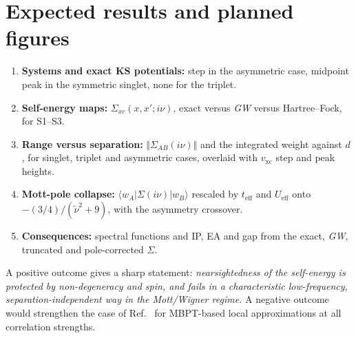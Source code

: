 \documentclass[11pt,a4paper]{article}
\newcommand{\GW}{\textit{GW}}
\newcommand{\vxc}{v_\mathrm{xc}}
\newcommand{\teff}{t_\mathrm{eff}}
\newcommand{\Ueff}{U_\mathrm{eff}}
\begin{document}
\section{Expected results and planned figures}
\begin{enumerate}
\item \textbf{Systems and exact KS potentials:} step in the asymmetric case, midpoint peak in the symmetric singlet, none for the triplet.
\item \textbf{Self-energy maps:} $\Sigma_{xc}(x,x';i\nu)$, exact versus \GW{} versus Hartree--Fock, for S1--S3.
\item \textbf{Range versus separation:} $\Vert\Sigma_{AB}(i\nu)\Vert$ and the integrated weight against $d$, for singlet, triplet and asymmetric cases, overlaid with $\vxc$ step and peak heights.
\item \textbf{Mott-pole collapse:} $\langle w_A|\Sigma(i\nu)|w_B\rangle$ rescaled by $\teff$ and $\Ueff$ onto $-(3/4)/(\tilde\nu^2+9)$, with the asymmetry crossover.
\item \textbf{Consequences:} spectral functions and IP, EA and gap from the exact, \GW{}, truncated and pole-corrected $\Sigma$.
\end{enumerate}

A positive outcome gives a sharp statement: \emph{nearsightedness of the self-energy is protected by non-degeneracy and spin, and fails in a characteristic low-frequency, separation-independent way in the Mott/Wigner regime.} A negative outcome would strengthen the case of Ref.~\cite{wetherell2019} for MBPT-based local approximations at all correlation strengths.

\end{document}
